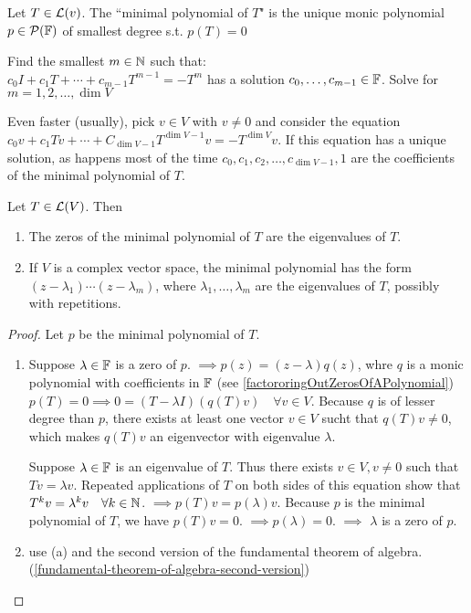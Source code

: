 \setcounter{thm}{23}

\begin{mydef}
    Let $T\in \mathcal{L} (v)$. The ``minimal polynomial of $T$" is the unique monic polynomial $p\in \mathcal{P}(\mathbb{F})$ of smallest degree s.t. $p(T)=0$
\end{mydef}
 Find the smallest $m \in \mathbb{N}$ such that: \\
$c_0I + c_1 T + \cdots + c_{m-1} T^{m-1} = -T^{m}$ has a solution $c_0, \dots, c_{m-1} \in \mathbb{F}$. Solve for $m=1,2,\dots,\dim V$

Even faster (usually), pick $v \in V$ with $v \neq 0$ and consider the equation $c_0v + c_1Tv + \cdots + C_{\dim V-1}T^{\dim V-1}v=-T^{\dim V}v$. 
If this equation has a unique solution, as happens most of the time $c_0, c_1, c_2, \dots, c_{\dim V-1}, 1$ are the coefficients of the minimal polynomial of $T$.

\setcounter{thm}{26}
\begin{thm}
    \label{zeros-of-the-minimal-polynomial-of-T-are-the-eigenvalues-of-T}
    Let $T \in \mathcal{L}(V)$. Then 
    \begin{enumerate}[label=(\alph*)]
        \item The zeros of the minimal polynomial of $T$ are the eigenvalues of $T$. 
        \item If $V$ is a complex vector space, the minimal polynomial has the form $(z-\lambda_1)\cdots(z-\lambda_m)$, where $\lambda_1, \dots, \lambda_m$ are the eigenvalues of $T$, possibly with repetitions. 
    \end{enumerate}
\end{thm}
\begin{proof} Let $p$ be the minimal polynomial of $T$.
    \begin{enumerate}[label=(\alph*)]
        \item Suppose $\lambda \in \mathbb{F}$ is a zero of $p$. $\implies p(z)=(z-\lambda)q(z)$, whre $q$ is a monic polynomial with coefficients in $\mathbb{F}$ (see \ref{factororingOutZerosOfAPolynomial}) \\
        $p(T)=0\implies 0=(T-\lambda I)(q(T)v) \quad \forall v\in V.$
        Because $q$ is of lesser degree than $p$, there exists at least one vector $v\in V$ sucht that $q(T)v \neq 0$, which makes $q(T)v$ an eigenvector with eigenvalue $\lambda$.
        
        Suppose $\lambda \in \mathbb{F}$ is an eigenvalue of $T$. Thus there exists $v\in V, v \neq 0$ such that $Tv=\lambda v$. Repeated applications of $T$ on both sides of this equation show that $T^kv =\lambda^k v \quad \forall k\in \mathbb{N}$. 
        $\implies p(T)v=p(\lambda)v$. Because $p$ is the minimal polynomial of $T$, we have $p(T)v=0$. $\implies p(\lambda) = 0$. $\implies$ $\lambda$ is a zero of $p$.
        
        \item use (a) and the second version of the fundamental theorem of algebra. (\ref{fundamental-theorem-of-algebra-second-version})
     \end{enumerate}
\end{proof}

